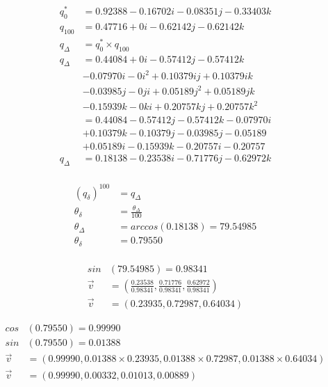 \documentclass{report}
\begin{document}
\begin{align*}
q_0^* &= 0.92388 - 0.16702i - 0.08351j - 0.33403k\\[1em]
q_{100} &= 0.47716 + 0i - 0.62142j - 0.62142k\\[1em]
q_{\Delta} &= q_0^* \times q_{100}\\[1em]
q_{\Delta} &= 0.44084 + 0i - 0.57412j - 0.57412k\\
 &- 0.07970i - 0i^2 + 0.10379ij + 0.10379ik\\
 &- 0.03985j - 0ji + 0.05189j^2 + 0.05189jk\\
 &- 0.15939k - 0ki + 0.20757kj + 0.20757k^2\\[1em]
 &= 0.44084 - 0.57412j - 0.57412k - 0.07970i\\
 &+ 0.10379k - 0.10379j - 0.03985j - 0.05189\\
 &+ 0.05189i - 0.15939k - 0.20757i - 0.20757\\[1em]
q_{\Delta} &=0.18138 - 0.23538i - 0.71776j - 0.62972k\\[1em]
\end{align*}

\begin{align*}
(q_{\delta})^{100} &= q_{\Delta}\\[1em]
\theta_{\delta} &= \frac{\theta_{\Delta}}{100}\\[1em]
\theta_{\Delta} &= arccos(0.18138) = 79.54985\\[1em]
\theta_{\delta} &= 0.79550\\
\end{align*}

\begin{align*}
sin&(79.54985) = 0.98341\\[1em]
\vec{v} &=  (\frac{0.23538}{0.98341}, \frac{0.71776}{0.98341}, \frac{0.62972}{0.98341})\\
\vec{v} &= (0.23935, 0.72987, 0.64034)
\end{align*}

\begin{align*}
cos&(0.79550) = 0.99990\\[1em]
sin&(0.79550) = 0.01388\\[1em]
\vec{v} &= (0.99990, 0.01388 \times 0.23935, 0.01388 \times 0.72987, 0.01388 \times 0.64034)\\[1em]
\vec{v} &= (0.99990, 0.00332, 0.01013, 0.00889)\\
\end{align*}
\end{document}
